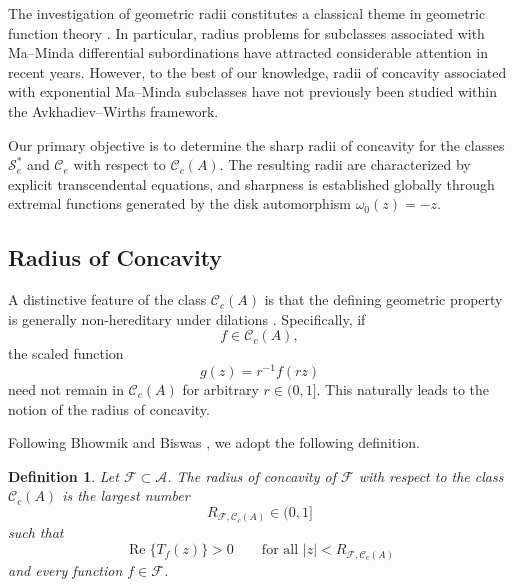 \documentclass[12pt]{article}
\newtheorem{definition}[theorem]{Definition}
\renewcommand{\Re}{\operatorname{Re}}
\begin{document}
The investigation of geometric radii constitutes a classical theme in geometric function theory \cite{pm8, pm9, pm12}. In particular, radius problems for subclasses associated with Ma--Minda differential subordinations have attracted considerable attention in recent years. However, to the best of our knowledge, radii of concavity associated with exponential Ma--Minda subclasses have not previously been studied within the Avkhadiev--Wirths framework.

Our primary objective is to determine the sharp radii of concavity for the classes $\mathcal{S}_e^*$ and $\mathcal{C}_e$ with respect to $\mathcal{C}_c(A)$. The resulting radii are characterized by explicit transcendental equations, and sharpness is established globally through extremal functions generated by the disk automorphism $\omega_0(z)=-z$.
\subsection{Radius of Concavity}

A distinctive feature of the class $\mathcal{C}_c(A)$ is that the defining geometric property is generally non-hereditary under dilations \cite{pm7}. Specifically, if
\[
f\in\mathcal{C}_c(A),
\]
the scaled function
\[
g(z)=r^{-1}f(rz)
\]
need not remain in $\mathcal{C}_c(A)$ for arbitrary $r\in(0,1]$. This naturally leads to the notion of the radius of concavity.

Following Bhowmik and Biswas \cite{pm7}, we adopt the following definition.

\begin{definition}
Let $\mathcal{F}\subset\mathcal{A}$. The radius of concavity of $\mathcal{F}$ with respect to the class $\mathcal{C}_c(A)$ is the largest number
\[
R_{\mathcal{F},\mathcal{C}_c(A)}\in(0,1]
\]
such that
\begin{equation}\label{pm2}
\Re\{T_f(z)\}>0
\qquad
\text{for all }
|z|<R_{\mathcal{F},\mathcal{C}_c(A)}
\end{equation}
and every function $f\in\mathcal{F}$.
\end{definition}
\end{document}
